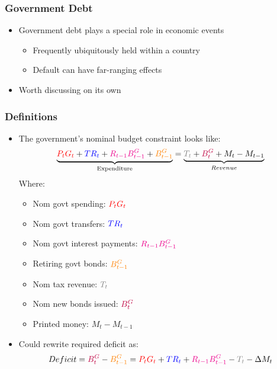 \documentclass{beamer}
\date{}
\author{Trevor Gallen}
\begin{document}
\renewcommand*{\inserttotalframenumber}{\pageref{lastframe}}

\begin{frame}
\titlepage
\end{frame}

\begin{frame}
\frametitle{Government Debt}
\begin{itemize}
\item Government debt plays a special role in economic events
\bigskip
\begin{itemize}
\item Frequently ubiquitously held within a country
\bigskip
\item Default can have far-ranging effects
\end{itemize}
\item Worth discussing on its own
\end{itemize}
\end{frame}


\begin{frame}
\frametitle{Definitions}
\begin{itemize}
\item The government's nominal budget constraint looks like:
$$\underbrace{\textcolor{red}{P_tG_t}+\textcolor{blue}{TR_t}+\textcolor{magenta}{R_{t-1}B_{t-1}^G}+\textcolor{orange}{B_{t-1}^G}}_{\text{Expenditure}}=\underbrace{\textcolor{gray}{T_t}+\textcolor{purple}{B_t^G}+M_t-M_{t-1}}_{Revenue}$$
Where:
\begin{itemize}
\item Nom govt spending: $\textcolor{red}{P_tG_t}$
\item Nom govt transfers: $\textcolor{blue}{TR_t}$
\item Nom govt interest payments: $\textcolor{magenta}{R_{t-1}B_{t-1}^G}$
\item Retiring govt bonds: $\textcolor{orange}{B_{t-1}^G}$
\item Nom tax revenue: $\textcolor{gray}{T_t}$
\item Nom new bonds issued: $\textcolor{purple}{B_t^G}$
\item Printed money: $M_t-M_{t-1}$
\end{itemize}
\item Could rewrite required deficit as:
$$Deficit=\textcolor{purple}{B_t^G}-\textcolor{orange}{B_{t-1}^G}=\textcolor{red}{P_tG_t}+\textcolor{blue}{TR_t}+\textcolor{magenta}{R_{t-1}B_{t-1}^G}-\textcolor{gray}{T_t}-\Delta M_t$$
\end{itemize}
\end{frame}
\end{document}

